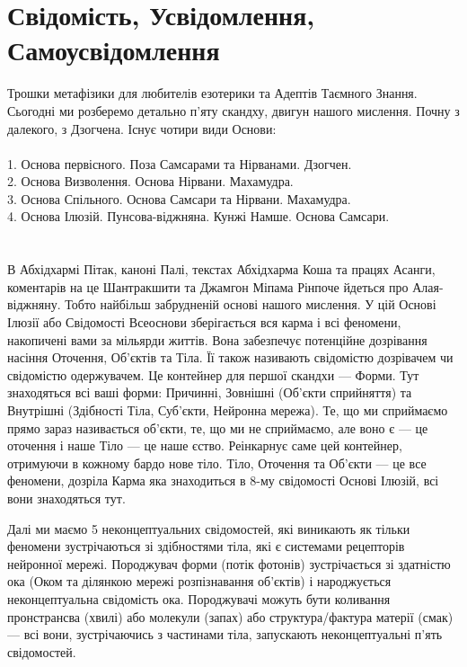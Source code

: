\section{Свідомість, Усвідомлення, Самоусвідомлення}

Трошки метафізики для любителів езотерики та Адептів Таємного Знання.
Сьогодні ми розберемо детально п'яту скандху, двигун нашого мислення.
Почну з далекого, з Дзогчена. Існує чотири види Основи:
\\
\\
1. Основа первісного. Поза Самсарами та Нірванами. Дзогчен.\\
2. Основа Визволення. Основа Нірвани. Махамудра.\\
3. Основа Спільного. Основа Самсари та Нірвани. Махамудра.\\
4. Основа Ілюзій. Пунсова-віджняна. Кунжі Намше. Основа Самсари.\\
\\
\\
В Абхідхармі Пітак, каноні Палі, текстах Абхідхарма Коша та працях Асанги,
коментарів на це Шантракшити та Джамгон Міпама Рінпоче йдеться
про Алая-віджняну. Тобто найбільш забрудненій основі нашого мислення.
У цій Основі Ілюзії або Свідомості Всеоснови зберігається вся карма
і всі феномени, накопичені вами за мільярди життів. Вона забезпечує
потенційне дозрівання насіння Оточення, Об'єктів та Тіла. Її також називають
свідомістю дозрівачем чи свідомістю одержувачем. Це контейнер для
першої скандхи --- Форми. Тут знаходяться всі ваші форми: Причинні,
Зовнішні (Об'єкти сприйняття) та Внутрішні (Здібності Тіла, Суб'єкти, Нейронна мережа).
Те, що ми сприймаємо прямо зараз називається об'єкти, те, що ми не сприймаємо,
але воно є --- це оточення і наше Тіло --- це наше єство. Реінкарнує саме цей контейнер,
отримуючи в кожному бардо нове тіло. Тіло, Оточення та Об'єкти ---
це все феномени, дозріла Карма яка знаходиться в 8-му свідомості Основі Ілюзій, всі вони знаходяться тут.

Далі ми маємо 5 неконцептуальних свідомостей, які виникають як тільки
феномени зустрічаються зі здібностями тіла, які є системами рецепторів
нейронної мережі. Породжувач форми (потік фотонів) зустрічається зі здатністю
ока (Оком та ділянкою мережі розпізнавання об'єктів) і народжується неконцептуальна
свідомість ока. Породжувачі можуть бути коливання пронстрансва (хвилі) або
молекули (запах) або структура/фактура матерії (смак) --- всі вони,
зустрічаючись з частинами тіла, запускають неконцептуальні п'ять свідомостей.

